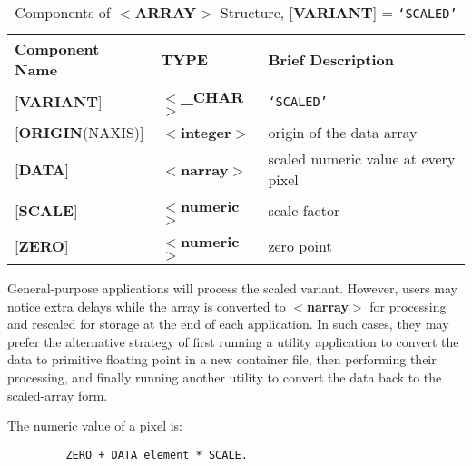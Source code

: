 \documentclass[twoside,11pt]{article}
\begin{document}
\begin{table}[htb]
\centering
\caption{Components of $<${\bf ARRAY}$>$ Structure, {[}{\bf VARIANT}{]} = {\tt `SCALED'}}
\begin{tabular}{|l|l|l|}
\hline
Component Name & TYPE & Brief Description \\ \hline
{[}{\bf VARIANT}{]} & $<${\bf \_CHAR}$>$ & {\tt `SCALED'} \\
{[}{\bf ORIGIN}(NAXIS){]} & $<${\bf integer}$>$ & origin of the data array \\
{[}{\bf DATA}{]} & $<${\bf narray}$>$ & scaled numeric value at every pixel \\
{[}{\bf SCALE}{]} & $<${\bf numeric}$>$ & scale factor \\
{[}{\bf ZERO}{]} & $<${\bf numeric}$>$ & zero point \\ \hline
\end{tabular}
\end{table}

General-purpose applications will process the scaled variant.
However, users may notice extra delays
while the array is converted to
$<${\bf narray}$>$ for processing
and rescaled for storage at the end of each application.  In such cases,
they may prefer the
alternative strategy of first running a utility application
to convert the data to primitive floating point in a new
container file, then performing their processing, and
finally running another utility to convert
the data back to the scaled-array
form.

The numeric value of a pixel is:
\begin{verbatim}
         ZERO + DATA element * SCALE.
\end{verbatim}
\end{document}
